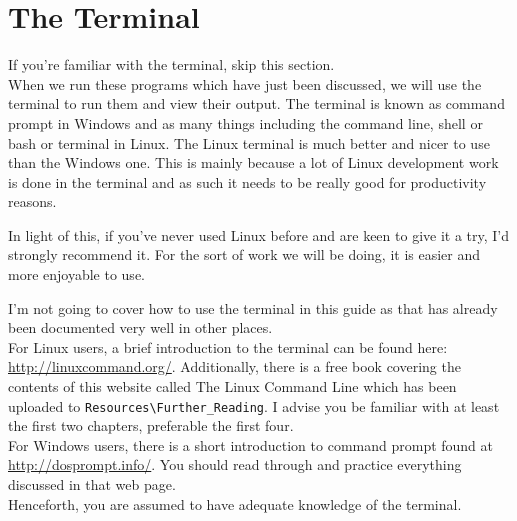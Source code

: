 \chapter{The Terminal}
If you're familiar with the terminal, skip this section.\\

When we run these programs which have just been discussed, we will use the terminal to run them and view their output. 
The terminal is known as command prompt in Windows and as many things including the command line, shell or bash or terminal in Linux.
The Linux terminal is much better and nicer to use than the Windows one. 
This is mainly because a lot of Linux development work is done in the terminal and as such it needs to be really good for productivity reasons. 

In light of this, if you've never used Linux before and are keen to give it a try, I'd strongly recommend it. For the sort of work we will be doing, it is easier and more enjoyable to use.

I'm not going to cover how to use the terminal in this guide as that has already been documented very well in other places.\\

For Linux users, a brief introduction to the terminal can be found here: \url{http://linuxcommand.org/}. Additionally, there is a free book covering the contents of this website called The Linux Command Line which has been uploaded to \verb+Resources\Further_Reading+. I advise you be familiar with at least the first two chapters, preferable the first four.\\

For Windows users, there is a short introduction to command prompt found at \url{http://dosprompt.info/}. You should read through and practice everything discussed in that web page.\\

Henceforth, you are assumed to have adequate knowledge of the terminal.

%
%

